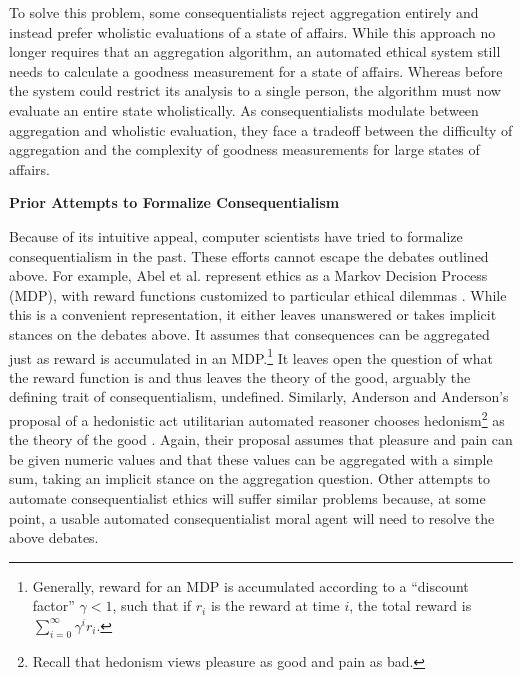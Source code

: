 \begin{isabellebody}
\begin{isamarkuptext}
To solve this problem, some consequentialists reject aggregation entirely and instead prefer wholistic
evaluations of a state of affairs. While this approach no longer requires that an 
aggregation algorithm, an automated ethical system still needs to calculate a goodness measurement for a state of 
affairs. Whereas before the system could restrict its analysis to a single person, the algorithm must now 
evaluate an entire state wholistically. As consequentialists modulate between aggregation 
and wholistic evaluation, they face a tradeoff between the difficulty of aggregation and the complexity 
of goodness measurements for large states of affairs.%
\end{isamarkuptext}\isamarkuptrue%
%
\begin{isamarkuptext}%
\noindent \textbf{Prior Attempts to Formalize Consequentialism}%
\end{isamarkuptext}\isamarkuptrue%
%
\begin{isamarkuptext}%
Because of its intuitive appeal, computer scientists have tried to formalize consequentialism in the past.
These efforts cannot escape the debates outlined above. For example, Abel et al. represent ethics as a
Markov Decision Process (MDP), with reward functions customized to particular ethical dilemmas 
\citep[3]{util1}. While this is a convenient representation, it either leaves unanswered or 
takes implicit stances on the debates above. It assumes that consequences can be aggregated just as 
reward is accumulated in an MDP.\footnote{Generally, reward for an MDP is accumulated according to a 
``discount factor'' $\gamma < 1$, such that if $r_i$ is the reward at time $i$, the total reward is $\sum_{i=0}^{\infty}\gamma^i r_i$.} 
It leaves open the question of what the reward function is and thus 
leaves the theory of the good, arguably the defining trait of consequentialism, 
undefined. Similarly, Anderson and Anderson's proposal of a hedonistic act 
utilitarian automated reasoner chooses hedonism\footnote{Recall that hedonism views pleasure as good
and pain as bad.} as the theory of the good \citep[2]{util2}. Again, their proposal assumes that pleasure and pain can be 
given numeric values and that these values can be aggregated with a simple sum, taking an implicit
stance on the aggregation question. Other attempts to automate consequentialist ethics will suffer 
similar problems because, at some point, a usable automated consequentialist moral agent will need 
to resolve the above debates.%
\end{isamarkuptext}\isamarkuptrue%
%

\end{isabellebody}
